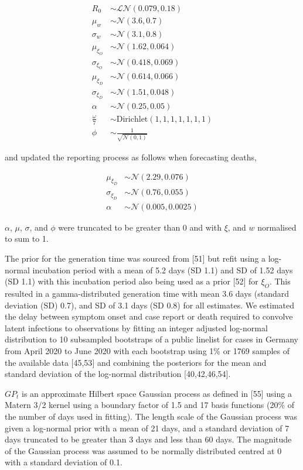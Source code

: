 \documentclass[10pt,letterpaper]{article}
\begin{document}
\begin{align}
     R_0 &\sim \mathcal{LN}(0.079, 0.18) \\
    \mu_w &\sim \mathcal{N}(3.6, 0.7) \\
    \sigma_w &\sim \mathcal{N}(3.1, 0.8) \\
    \mu_{\xi_{O}} &\sim \mathcal{N}(1.62, 0.064) \\
    \sigma_{\xi_{O}} &\sim \mathcal{N}(0.418, 0.069) \\
    \mu_{\xi_{D}} &\sim \mathcal{N}(0.614, 0.066) \\
    \sigma_{\xi_{D}} &\sim \mathcal{N}(1.51, 0.048) \\
    \alpha &\sim \mathcal{N}(0.25, 0.05) \\
    \frac{\omega}{7} &\sim \mathrm{Dirichlet}(1, 1, 1, 1, 1, 1, 1) \\
    \phi &\sim \frac{1}{\sqrt{\mathcal{N}(0, 1)}}
\end{align}

and updated the reporting process as follows when forecasting deaths,

\begin{align}
    \mu_{\xi_{D}} &\sim \mathcal{N}(2.29, 0.076) \\
    \sigma_{\xi_{D}} &\sim \mathcal{N}(0.76, 0.055) \\
    \alpha &\sim \mathcal{N}(0.005, 0.0025) 
\end{align}

\(\alpha\), \(\mu\), \(\sigma\), and \(\phi\) were truncated to be
greater than 0 and with \(\xi\), and \(w\) normalised to sum to 1.

The prior for the generation time was sourced from {[}51{]} but refit
using a log-normal incubation period with a mean of 5.2 days (SD 1.1)
and SD of 1.52 days (SD 1.1) with this incubation period also being used
as a prior {[}52{]} for \(\xi_{O}\). This resulted in a
gamma-distributed generation time with mean 3.6 days (standard deviation
(SD) 0.7), and SD of 3.1 days (SD 0.8) for all estimates. We estimated
the delay between symptom onset and case report or death required to
convolve latent infections to observations by fitting an integer
adjusted log-normal distribution to 10 subsampled bootstraps of a public
linelist for cases in Germany from April 2020 to June 2020 with each
bootstrap using 1\% or 1769 samples of the available data {[}45,53{]}
and combining the posteriors for the mean and standard deviation of the
log-normal distribution {[}40,42,46,54{]}.

\(GP_t\) is an approximate Hilbert space Gaussian process as defined in
{[}55{]} using a Matern 3/2 kernel using a boundary factor of 1.5 and 17
basis functions (20\% of the number of days used in fitting). The length
scale of the Gaussian process was given a log-normal prior with a mean
of 21 days, and a standard deviation of 7 days truncated to be greater
than 3 days and less than 60 days. The magnitude of the Gaussian process
was assumed to be normally distributed centred at 0 with a standard
deviation of 0.1.
\end{document}
